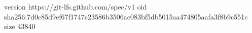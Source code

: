 version https://git-lfs.github.com/spec/v1
oid sha256:7d0c85d9ef67f1747c23586b3506ac083bf5db5015aa474805aafa3f8b9c551c
size 43840
